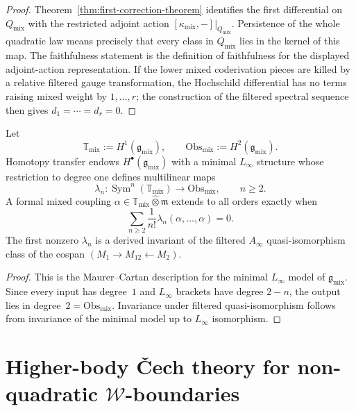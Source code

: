 \begin{proof}
Theorem~\ref{thm:first-correction-theorem} identifies the first
differential on $Q_{\mathrm{mix}}$ with the restricted adjoint action
$[\kappa_{\mathrm{mix}},-]\big|_{Q_{\mathrm{mix}}}$. Persistence of the
whole quadratic law means precisely that every class in
$Q_{\mathrm{mix}}$ lies in the kernel of this map. The faithfulness
statement is the definition of faithfulness for the displayed
adjoint-action representation. If the lower mixed coderivation pieces
are killed by a relative filtered gauge transformation, the Hochschild
differential has no terms raising mixed weight by $1,\dots,r$; the
construction of the filtered spectral sequence then gives
$d_1=\cdots=d_r=0$.
\end{proof}

\begin{theorem}
\label{thm:universal-interaction-brackets}
Let
\[
\mathbb T_{\mathrm{mix}}:=H^1(\mathfrak g_{\mathrm{mix}}),
\qquad
\mathrm{Obs}_{\mathrm{mix}}:=H^2(\mathfrak g_{\mathrm{mix}}).
\]
Homotopy transfer endows $H^\bullet(\mathfrak g_{\mathrm{mix}})$ with a minimal $L_\infty$ structure whose restriction to degree one defines multilinear maps
\[
\lambda_n : \operatorname{Sym}^n(\mathbb T_{\mathrm{mix}}) \longrightarrow \mathrm{Obs}_{\mathrm{mix}},
\qquad n\ge 2.
\]
A formal mixed coupling $\alpha\in \mathbb T_{\mathrm{mix}}\widehat\otimes \mathfrak m$ extends to all orders exactly when
\[
\sum_{n\ge 2}\frac{1}{n!}\lambda_n(\alpha,\dots,\alpha)=0.
\]
The first nonzero $\lambda_n$ is a derived invariant of the filtered $A_\infty$ quasi-isomorphism class of the cospan $(M_1\to M_{12}\leftarrow M_2)$.
\end{theorem}

\begin{proof}
This is the Maurer--Cartan description for the minimal $L_\infty$ model of $\mathfrak g_{\mathrm{mix}}$. Since every input has degree~$1$ and $L_\infty$ brackets have degree $2-n$, the output lies in degree~$2 = \mathrm{Obs}_{\mathrm{mix}}$. Invariance under filtered quasi-isomorphism follows from invariance of the minimal model up to $L_\infty$ isomorphism.
\end{proof}


\section{Higher-body \v{C}ech theory for non-quadratic $\mathcal W$-boundaries}
\label{sec:w-boundary-cech-theory}

